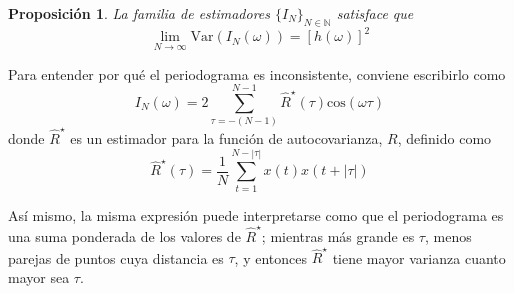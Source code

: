 \documentclass[12pt,letterpaper]{book}
\newtheorem{proposicion}[teorema]{Proposición}
\newcommand{\N}{\mathbb{N}}
\newcommand{\COS}[1]{\mathrm{cos}\left( #1 \right)}
\newcommand{\E}[1]{\mathrm{E}\left[ #1 \right]}
\newcommand{\Var}[1]{\mathrm{Var}\left( #1 \right)}
\newcommand{\abso}[1]{\left| #1 \right|}
\begin{document}
\begin{proposicion}
La familia de estimadores $\{I_N\}_{N\in\N}$ satisface que
\begin{equation}
\lim_{N\rightarrow \infty} \Var{I_N(\omega)} = \left[ h(\omega) \right]^{2}
\end{equation}
\label{lazy-algo}
\end{proposicion}


%
Para entender por qué el periodograma es inconsistente, conviene escribirlo como
\begin{equation}
I_N(\omega) = 2 \sum_{\tau = -(N-1)}^{N-1} \widehat{R}^{\star}(\tau) \COS{\omega \tau}
\label{txt_periodograma2}
\end{equation}
%
donde $\widehat{R}^{\star}$ es un estimador para la función de autocovarianza, $R$, definido como
\begin{equation}
\widehat{R}^{\star} (\tau) = \frac{1}{N} \sum_{t = 1}^{N-\abso{\tau}} x(t) x(t+\abso{\tau})
\end{equation}

Así mismo, la misma expresión puede interpretarse como que el periodograma es una suma ponderada de 
los valores de $\widehat{R}^{\star}$; mientras más grande es $\tau$, menos parejas de puntos cuya 
distancia es $\tau$, y entonces $\widehat{R}^{\star}$ tiene mayor varianza cuanto mayor sea $\tau$. 
\end{document}
